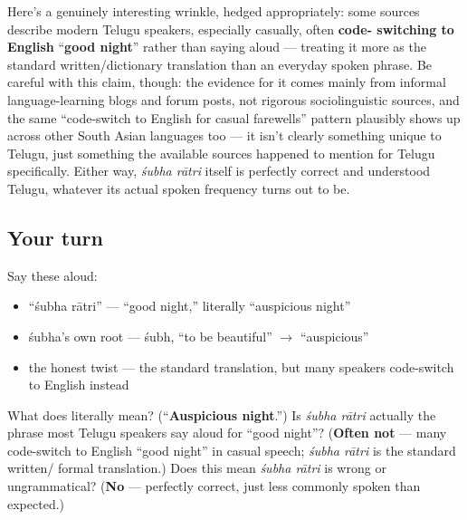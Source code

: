\begin{culture}
Here's a genuinely interesting wrinkle, hedged appropriately: some sources describe modern Telugu speakers, especially casually, often \textbf{code- switching to English} \textquotedblleft{}\textbf{good night}\textquotedblright{} rather than saying \textbf{ } aloud — treating it more as the standard written/dictionary translation than an everyday spoken phrase. Be careful with this claim, though: the evidence for it comes mainly from informal language-learning blogs and forum posts, not rigorous sociolinguistic sources, and the same \textquotedblleft{}code-switch to English for casual farewells\textquotedblright{} pattern plausibly shows up across other South Asian languages too — it isn't clearly something unique to Telugu, just something the available sources happened to mention for Telugu specifically. Either way, \emph{śubha rātri} itself is perfectly correct and understood Telugu, whatever its actual spoken frequency turns out to be.
\end{culture}

\subsection*{Your turn}
Say these aloud:

\begin{itemize}
\raggedright
  \item \textquotedblleft{}śubha rātri\textquotedblright{} — \textquotedblleft{}good night,\textquotedblright{} literally \textquotedblleft{}auspicious night\textquotedblright{}
  \item śubha's own root — śubh, \textquotedblleft{}to be beautiful\textquotedblright{} $\to$ \textquotedblleft{}auspicious\textquotedblright{}
  \item the honest twist — the standard translation, but many speakers code-switch to English instead
\end{itemize}

\begin{tcolorbox}[breakable,colback=teal!4,colframe=teal!35!black,title={Before you move on}]
What does \textbf{ } literally mean? (\textquotedblleft{}\textbf{Auspicious night}.\textquotedblright{}) Is \emph{śubha rātri} actually the phrase most Telugu speakers say aloud for \textquotedblleft{}good night\textquotedblright{}? (\textbf{Often not} — many code-switch to English \textquotedblleft{}good night\textquotedblright{} in casual speech; \emph{śubha rātri} is the standard written/ formal translation.) Does this mean \emph{śubha rātri} is wrong or ungrammatical? (\textbf{No} — perfectly correct, just less commonly spoken than expected.)
\end{tcolorbox}
